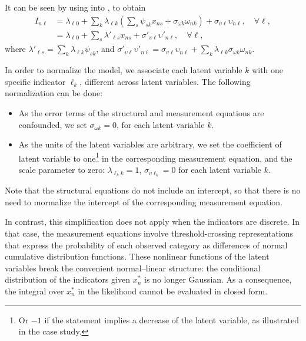 \documentclass[12pt,a4paper]{article}
\begin{document}
It can be seen by using  into  , to obtain
\begin{equation}
  \begin{aligned}
    I_{n\ell} &= \lambda_{\ell 0}  + \sum_k \lambda_{\ell k}  (\sum_s \psi_{sk} x_{ns} + \sigma_{\omega k} \omega_{nk}) + \sigma_{\upsilon \ell} \upsilon_{n\ell}, \quad \forall \ell, \\
    &= \lambda_{\ell 0} + \sum_s \lambda'_{\ell s} x_{ns} + \sigma'_{\upsilon \ell} \upsilon'_{n\ell}, \quad \forall \ell, 
  \end{aligned}
\end{equation}
where  $\lambda'_{\ell s}=\sum_k \lambda_{\ell k}  \psi_{sk}$, and $\sigma'_{\upsilon \ell} \upsilon'_{n\ell}= \sigma_{\upsilon \ell} \upsilon_{n\ell} + \sum_k \lambda_{\ell k}\sigma_{\omega k} \omega_{nk}$.



In order to normalize the model, we associate each latent variable $k$ with one specific indicator $\ell_k$,  different across latent variables.
The following normalization can be done:
\begin{itemize}
\item As the error terms of the structural and measurement equations are confounded, we set $\sigma_{\omega k}=0$, for each latent variable $k$.
\item As the units of the latent variables are arbitrary, we set the coefficient of latent variable to one\footnote{Or $-1$ if the statement implies a decrease of the latent variable, as illustrated in the case study.}  in the corresponding measurement equation, and the scale parameter to zero: $\lambda_{\ell_k k}=1$, $\sigma_{\upsilon \ell_k}=0$ for each latent variable $k$.
\end{itemize}
Note that the structural equations do not include an intercept, so that there is no need to mormalize the intercept of the corresponding measurement equation. 


In contrast, this simplification does not apply when the indicators
are discrete. In that case, the measurement equations involve
threshold-crossing representations that express the probability
 of each observed category as differences of
normal cumulative distribution functions. These nonlinear functions of
the latent variables break the convenient normal–linear structure:
the conditional distribution of the indicators given $x_n^*$ is no
longer Gaussian. As a consequence, the integral over $x_n^*$ in the
likelihood cannot be evaluated in closed form.
\end{document}
